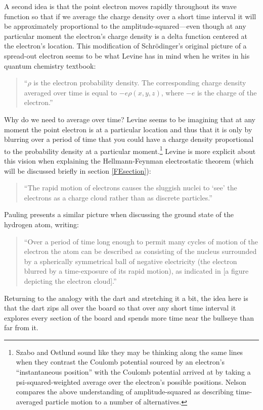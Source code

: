 \documentclass[onecolumn,secnumarabic,amsmath,amssymb,balancelastpage,nofootinbib]{article}
\begin{document}
A second idea is that the point electron moves rapidly throughout its wave function so that if we average the charge density over a short time interval it will be approximately proportional to the amplitude-squared---even though at any particular moment the electron's charge density is a delta function centered at the electron's location.  This modification of Schr\"{o}dinger's original picture of a spread-out electron seems to be what Levine has in mind when he writes in his quantum chemistry textbook:
\begin{quote}
``$\rho$ is the electron probability density.  The corresponding charge density averaged over time is equal to $-e\rho(x,y,z)$, where $-e$ is the charge of the electron.'' \cite[pg.\ 403]{levineQC}
\end{quote}
Why do we need to average over time?  Levine seems to be imagining that at any moment the point electron is at a particular location and thus that it is only by blurring over a period of time that you could have a charge density proportional to the probability density at a particular moment.\footnote{Szabo and Ostlund \cite[sec.\ 3.1.1]{szaboQC} sound like they may be thinking along the same lines when they contrast the Coulomb potential sourced by an electron's ``instantaneous position'' with the Coulomb potential arrived at by taking a psi-squared-weighted average over the electron's possible positions.  Nelson \cite{nelson1990} compares the above understanding of amplitude-squared as describing time-averaged particle motion to a number of alternatives.}  Levine is more explicit about this vision when explaining the Hellmann-Feynman electrostatic theorem (which will be discussed briefly in section \ref{FEsection}):
\begin{quote}
``The rapid motion of electrons causes the sluggish nuclei to `see' the electrons as a charge cloud rather than as discrete particles.'' \cite[pg.\ 430]{levineQC}
\end{quote}
Pauling presents a similar picture when discussing the ground state of the hydrogen atom, writing:
\begin{quote}
``Over a period of time long enough to permit many cycles of motion of the electron the atom can be described as consisting of the nucleus surrounded by a spherically symmetrical ball of negative electricity (the electron blurred by a time-exposure of its rapid motion), as indicated in [a figure depicting the electron cloud].'' \cite[pg.\ 15]{pauling1960}
\end{quote}
Returning to the analogy with the dart and stretching it a bit, the idea here is that the dart zips all over the board so that over any short time interval it explores every section of the board and spends more time near the bullseye than far from it.
\end{document}
